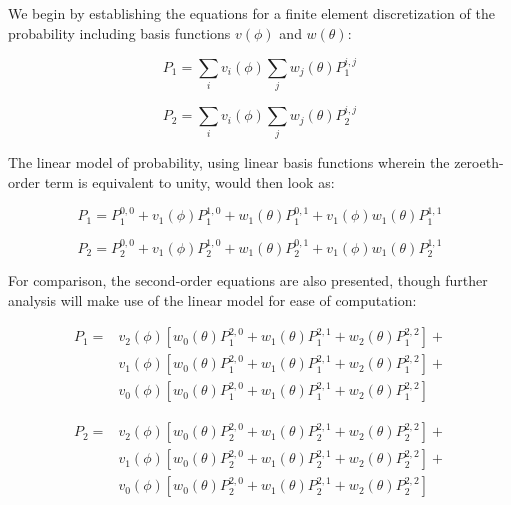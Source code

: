 \documentclass[12pt,a4paper,pagesize=pdftex]{scrartcl}
\begin{document}
We begin by establishing the equations for a finite element discretization of the probability including basis functions \(v\left(\phi\right)\) and \(w\left(\theta\right)\):

\begin{equation*}
    P_1 = \sum_i v_i\left(\phi\right) \sum_j w_j\left(\theta\right) P_1^{i,j}
\end{equation*}

\begin{equation*}
    P_2  = \sum_i v_i\left(\phi\right) \sum_j w_j\left(\theta\right) P_2^{i,j}
\end{equation*}

The linear model of probability, using linear basis functions wherein the zeroeth-order term is equivalent to unity, would then look as:

\begin{equation*}
    P_1 = P_1^{0,0} + v_1\left(\phi\right) P_1^{1,0} + w_1\left(\theta\right) P_1^{0,1} + v_1\left(\phi\right) w_1\left(\theta\right) P_1^{1,1}
\end{equation*}

\begin{equation*}
    P_2 = P_2^{0,0} + v_1\left(\phi\right) P_2^{1,0} + w_1\left(\theta\right) P_2^{0,1} + v_1\left(\phi\right) w_1\left(\theta\right) P_2^{1,1}
\end{equation*}

For comparison, the second-order equations are also presented, though further analysis will make use of the linear model for ease of computation:

\begin{align*}
    P_1 = & v_2\left(\phi\right) \left[w_0\left(\theta\right) P_1^{2,0} + w_1\left(\theta\right) P_1^{2,1} + w_2\left(\theta\right) P_1^{2,2}\right] + \\
    & v_1\left(\phi\right) \left[w_0\left(\theta\right) P_1^{2,0} + w_1\left(\theta\right) P_1^{2,1} + w_2\left(\theta\right) P_1^{2,2}\right] + \\
    & v_0\left(\phi\right) \left[w_0\left(\theta\right) P_1^{2,0} + w_1\left(\theta\right) P_1^{2,1} + w_2\left(\theta\right) P_1^{2,2}\right]
\end{align*}

\begin{align*}
    P_2 = & v_2\left(\phi\right) \left[w_0\left(\theta\right) P_2^{2,0} + w_1\left(\theta\right) P_2^{2,1} + w_2\left(\theta\right) P_2^{2,2}\right] + \\
    & v_1\left(\phi\right) \left[w_0\left(\theta\right) P_2^{2,0} + w_1\left(\theta\right) P_2^{2,1} + w_2\left(\theta\right) P_2^{2,2}\right] + \\
    & v_0\left(\phi\right) \left[w_0\left(\theta\right) P_2^{2,0} + w_1\left(\theta\right) P_2^{2,1} + w_2\left(\theta\right) P_2^{2,2}\right]
\end{align*}
\end{document}
